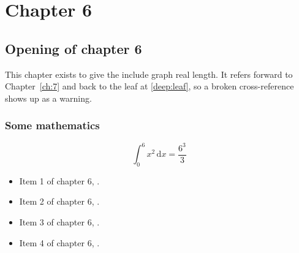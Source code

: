 \chapter{Chapter 6}
\label{ch:6}
\section{Opening of chapter 6}
This chapter exists to give the include graph real length. It refers
forward to Chapter~\ref{ch:7} and back to the leaf
at \ref{deep:leaf}, so a broken cross-reference shows up as a warning.

\subsection{Some mathematics}
\begin{equation}
  \int_0^{6} x^{2} \, \mathrm{d}x = \frac{6^{3}}{3}
\end{equation}

\begin{itemize}
  \item Item 1 of chapter 6, .
  \item Item 2 of chapter 6, .
  \item Item 3 of chapter 6, .
  \item Item 4 of chapter 6, .
\end{itemize}
